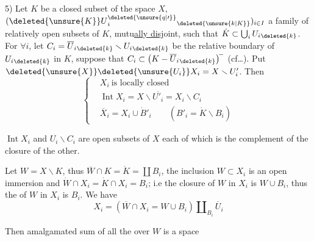 
5) Let $K$ be a closed subset of the space $X$, $(\deleted{\unsure{K}}U{}^{\deleted{\unsure{q|\prime}}}_i{}_{\deleted{\unsure{k|K}}})_{i\in I}$ a family of relatively open subsets of $K$, mutu\uline{ally disj}oint, such that $\dot K\subset\bigcup_i U_i{}_{\deleted{k}}$.   For $\forall i$, let $C_i=\overline U_i{}_{\deleted{k}}\smallsetminus U_i{}_{\deleted{k}}$ be the relative boundary of $U_i{}_{\deleted{k}}$ in $K$, suppose that $C_i\subset\bigl(K-\overline U_i{}_{\deleted{k}}\bigr)^{\! -}$ (cf\ldots). Put $\deleted{\unsure{X}}\deleted{\unsure{U_i}}X_i=X\smallsetminus U'_i$. Then
\[
\left\{\begin{aligned}
&X_i\ \text{is locally closed}\\
&\operatorname{Int}X_i=X\smallsetminus\overline{U'_i}=X_i\smallsetminus C_i\\
&\overline X_i=X_i\cup \dot B'_i\qquad(B'_i=\dot K\smallsetminus B_i)
\end{aligned}\right.
\]

$\operatorname{Int}X_i$ and \uline{$U_i\smallsetminus C_i$} are  open subsets of $X$ each of which is the complement of the closure of the other.

Let $W=X\smallsetminus K$,  thus  $\overline W\cap K=\dot K=\coprod B_i$, the inclusion $W\subset X_i$ is an open immersion and $\dot W\cap X_i=\dot K\cap X_i=B_i$;  i.e  the closure of $W$ in $X_i$ is $W\cup B_i$, thus the  of $W$ in $X_i$ is $B_i$. We have
\[
X_i=(\overline W\cap X_i=W\cup B_i)\amalg_{B_i}\overline U_i
\]


Then  amalgamated sum of all the  over $W$ is a space
